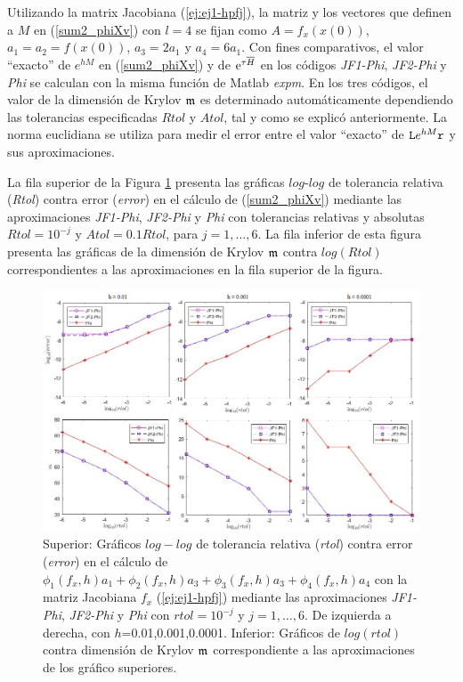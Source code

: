 Utilizando la matrix Jacobiana (\ref{ej:ej1-hpfj}), la matriz y los vectores que definen a $M$ en (\ref{sum2_phiXv}) con $l=4$ se fijan como $A=f_x(x(0))$, $a_1=a_2=f(x(0))$, $a_3=2a_1 $ y $a_4=6a_1$. Con fines comparativos, el valor ``exacto'' de $e^{h M}$ en (\ref{sum2_phiXv}) y de $\mathrm{e}^{\tau\overline{H}}$ en los códigos \textit{JF1-Phi}, \textit{JF2-Phi} y \textit{Phi} se calculan con la misma función de Matlab \textit{expm}. En los tres códigos, el valor de la dimensión de Krylov $\mathfrak{m}$ es determinado automáticamente dependiendo las tolerancias especificadas $Rtol$ y $Atol$, tal y como se explicó anteriormente. La norma euclidiana se utiliza para medir el error entre el valor ``exacto'' de $\mathtt{L} e^{h M}\mathtt{r}$ y sus aproximaciones.

La fila superior de la Figura \ref{fig:SumPhiBrusselator} presenta las gráficas $log$-$log$ de tolerancia relativa (\textit{Rtol}) contra error (\textit{error}) en el cálculo de (\ref{sum2_phiXv}) mediante las aproximaciones \textit{JF1-Phi}, \textit{JF2-Phi} y \textit{Phi} con tolerancias relativas y absolutas $Rtol=10^{-j}$ y $Atol=0$.$1 Rtol$, para $j=1,\ldots,6$. La fila inferior de esta figura presenta las gráficas de la dimensión de Krylov $\mathfrak{m}$ contra $log(Rtol)$ correspondientes a las aproximaciones en la fila superior de la figura.

\begin{figure}[htb]
	\includegraphics[scale=0.57]{Graphics/kpfj-brusselator-em.jpg}
	\caption{Superior: Gráficos $log-log$ de tolerancia relativa (\textit{rtol}) contra error (\textit{error}) en el cálculo de $\phi _{1}(f_x,h)a_{1}+\phi _{2}(f_x,h)a_{3}+\phi _{3}(f_x,h)a_{3}+\phi _{4}(f_x,h)a_{4}$ con la matriz Jacobiana $f_x$ (\ref{ej:ej1-hpfj}) mediante las aproximaciones \textit{JF1-Phi}, \textit{JF2-Phi} y \textit{Phi} con $rtol=10^{-j}$ y $j=1,\ldots,6$. De izquierda a derecha, con $h$=0.01,0.001,0.0001. Inferior: Gráficos de $log(rtol)$ contra dimensión de Krylov $\mathfrak{m}$ correspondiente a las aproximaciones de los gráfico superiores.}
	\label{fig:SumPhiBrusselator}
\end{figure}

